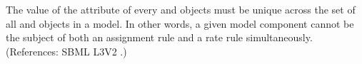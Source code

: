 The value of the attribute  of every \AssignmentRule and
\RateRule objects must be unique across the set of all \AssignmentRule and
\RateRule objects in a model.  In other words, a given model component
cannot be the subject of both an assignment rule and a rate rule
simultaneously.  (References: SBML L3V2 .)
